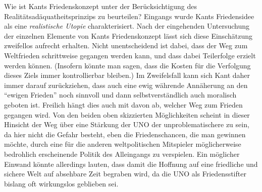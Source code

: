 \documentclass[12pt,a4paper,ngerman]{article}
\begin{document}
Wie ist Kants Friedenskonzept unter der Berücksichtigung des
Realitätsadäquatheitsprinzips zu beurteilen? Eingangs wurde Kants
Friedensidee als eine {\em realistische Utopie} charakterisiert. Nach
der eingehenden Untersuchung der einzelnen Elemente von Kants
Friedenskonzept lässt sich diese Einschätzung zweifellos aufrecht
erhalten. Nicht unentscheidend ist dabei, dass der Weg zum Weltfrieden
schrittweise gegangen werden kann, und dass dabei Teilerfolge erzielt
werden können.  (Insofern könnte man sagen, dass die Kosten für die
Verfolgung dieses Ziels immer kontrollierbar bleiben.) Im Zweifelsfall
kann sich Kant daher immer darauf zurückziehen, dass auch eine
ewig währende Annäherung an den "`ewigen Frieden"' noch sinnvoll und
dann selbstverständlich auch moralisch geboten ist. Freilich hängt
dies auch mit davon ab, welcher Weg zum Frieden gegangen wird. Von den
beiden oben skizzierten Möglichkeiten scheint in dieser Hinsicht der
Weg über eine Stärkung der UNO der unproblematischere zu sein, da hier
nicht die Gefahr besteht, eben die Friedenschancen, die man gewinnen
möchte, durch eine für die anderen weltpolitischen Mitspieler
möglicherweise bedrohlich erscheinende Politik des Alleingangs zu
verspielen. Ein möglicher Einwand könnte allerdings lauten, dass damit
die Hoffnung auf eine friedliche und sichere Welt auf absehbare Zeit
begraben wird, da die UNO als Friedensstifter bislang oft
wirkungslos geblieben sei.
\end{document}
